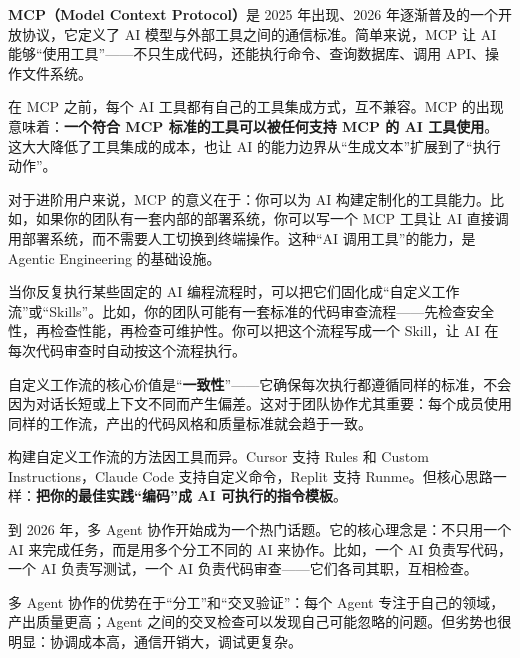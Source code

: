 


\textbf{MCP（Model Context Protocol）}是 2025 年出现、2026 年逐渐普及的一个开放协议，它定义了 AI 模型与外部工具之间的通信标准。简单来说，MCP 让 AI 能够“使用工具”——不只生成代码，还能执行命令、查询数据库、调用 API、操作文件系统。

在 MCP 之前，每个 AI 工具都有自己的工具集成方式，互不兼容。MCP 的出现意味着：\textbf{一个符合 MCP 标准的工具可以被任何支持 MCP 的 AI 工具使用}。这大大降低了工具集成的成本，也让 AI 的能力边界从“生成文本”扩展到了“执行动作”。

对于进阶用户来说，MCP 的意义在于：你可以为 AI 构建定制化的工具能力。比如，如果你的团队有一套内部的部署系统，你可以写一个 MCP 工具让 AI 直接调用部署系统，而不需要人工切换到终端操作。这种“AI 调用工具”的能力，是 Agentic Engineering 的基础设施。


当你反复执行某些固定的 AI 编程流程时，可以把它们固化成“自定义工作流”或“Skills”。比如，你的团队可能有一套标准的代码审查流程——先检查安全性，再检查性能，再检查可维护性。你可以把这个流程写成一个 Skill，让 AI 在每次代码审查时自动按这个流程执行。

自定义工作流的核心价值是“\textbf{一致性}”——它确保每次执行都遵循同样的标准，不会因为对话长短或上下文不同而产生偏差。这对于团队协作尤其重要：每个成员使用同样的工作流，产出的代码风格和质量标准就会趋于一致。

构建自定义工作流的方法因工具而异。Cursor 支持 Rules 和 Custom Instructions，Claude Code 支持自定义命令，Replit 支持 Runme。但核心思路一样：\textbf{把你的最佳实践“编码”成 AI 可执行的指令模板}。


到 2026 年，多 Agent 协作开始成为一个热门话题。它的核心理念是：不只用一个 AI 来完成任务，而是用多个分工不同的 AI 来协作。比如，一个 AI 负责写代码，一个 AI 负责写测试，一个 AI 负责代码审查——它们各司其职，互相检查。

多 Agent 协作的优势在于“分工”和“交叉验证”：每个 Agent 专注于自己的领域，产出质量更高；Agent 之间的交叉检查可以发现自己可能忽略的问题。但劣势也很明显：协调成本高，通信开销大，调试更复杂。

